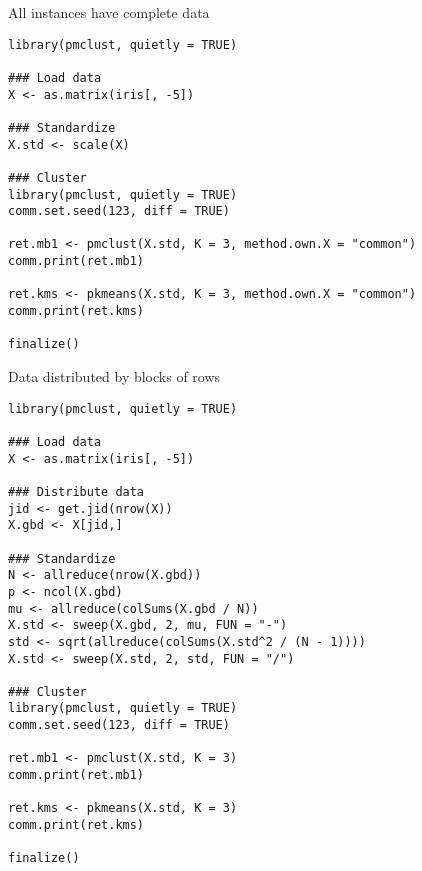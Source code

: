 \begin{frame}[fragile]
  \begin{exampleblock}{All instances have complete data}\pause
    \begin{lstlisting}[title=iris\_common.r]
library(pmclust, quietly = TRUE)

### Load data
X <- as.matrix(iris[, -5])

### Standardize
X.std <- scale(X)

### Cluster
library(pmclust, quietly = TRUE)
comm.set.seed(123, diff = TRUE)

ret.mb1 <- pmclust(X.std, K = 3, method.own.X = "common")
comm.print(ret.mb1)

ret.kms <- pkmeans(X.std, K = 3, method.own.X = "common")
comm.print(ret.kms)

finalize()
    \end{lstlisting} %
  \end{exampleblock}
\end{frame}

\begin{frame}[fragile]
  \begin{exampleblock}{Data distributed by blocks of rows}\pause
    \begin{lstlisting}[title=iris\_gbdr.r]
library(pmclust, quietly = TRUE)

### Load data
X <- as.matrix(iris[, -5])

### Distribute data
jid <- get.jid(nrow(X))
X.gbd <- X[jid,]

### Standardize
N <- allreduce(nrow(X.gbd))
p <- ncol(X.gbd)
mu <- allreduce(colSums(X.gbd / N))
X.std <- sweep(X.gbd, 2, mu, FUN = "-")
std <- sqrt(allreduce(colSums(X.std^2 / (N - 1))))
X.std <- sweep(X.std, 2, std, FUN = "/")

### Cluster
library(pmclust, quietly = TRUE)
comm.set.seed(123, diff = TRUE)

ret.mb1 <- pmclust(X.std, K = 3)
comm.print(ret.mb1)

ret.kms <- pkmeans(X.std, K = 3)
comm.print(ret.kms)

finalize()
    \end{lstlisting} %
  \end{exampleblock}
\end{frame}


